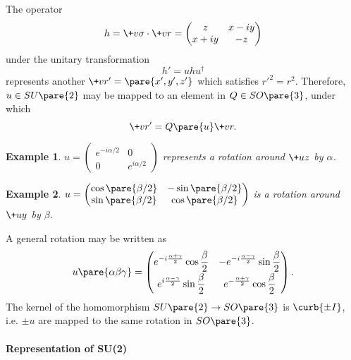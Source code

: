 \documentclass[hidelinks]{article}
\newtheorem{example}{Example}
\begin{document}
The operator
\[ h = \+v\sigma\cdot \+vr = \begin{pmatrix}
    z & x-iy \\
    x+iy & -z
\end{pmatrix} \]
under the unitary transformation
\[ h' = uhu^\dagger \]
represents another $\+vr' = \pare{x',y',z'}$ which satisfies $r'^2 = r^2$. Therefore, $u\in SU\pare{2}$ may be mapped to an element in $Q\in SO\pare{3}$, under which
\[ \+vr' = Q\pare{u}\+vr. \]
\begin{sample}
    \begin{example}
        $\displaystyle u = \begin{pmatrix}
            e^{-i\alpha/2} & 0 \\
            0 & e^{i\alpha/2}
        \end{pmatrix}$ represents a rotation around $\+uz$ by $\alpha$.
    \end{example}
\end{sample}
\begin{sample}
    \begin{example}
        $\displaystyle u = \begin{pmatrix}
            \cos \pare{\beta/2} & -\sin\pare{\beta/2} \\
            \sin\pare{\beta/2} & \cos\pare{\beta/2}
        \end{pmatrix}$ is a rotation around $\+uy$ by $\beta$.
    \end{example}
\end{sample}
A general rotation may be written as
\[ u\pare{\alpha\beta\gamma} = \begin{pmatrix}
    \displaystyle e^{-i\frac{\alpha+\gamma}{2}}\cos \frac{\beta}{2} &\displaystyle  -e^{-i\frac{\alpha-\gamma}{2}}\sin \frac{\beta}{2} \\[.5em]
    \displaystyle e^{i\frac{\alpha-\gamma}{2}}\sin\frac{\beta}{2} & \displaystyle e^{-\frac{\alpha+\gamma}{2}}\cos\frac{\beta}{2}
\end{pmatrix}. \]
The kernel of the homomorphism $SU\pare{2} \rightarrow SO\pare{3}$ is $\curb{\pm I}$, i.e. $\pm u$ are mapped to the same rotation in $SO\pare{3}$.


\paragraph{Representation of SU(2)} %
\label{par:representation_of_SU2}
\end{document}
